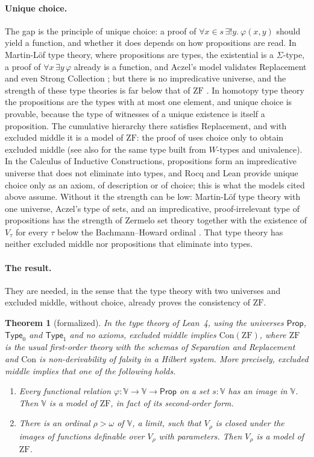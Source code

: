 \documentclass[10pt]{article}
\newtheorem{theorem}{Theorem}[section]
\theoremstyle{definition}
\theoremstyle{remark}
\newcommand{\Prop}{\mathsf{Prop}}
\newcommand{\Type}{\mathsf{Type}}
\newcommand{\ZF}{\mathrm{ZF}}
\newcommand{\Con}{\mathrm{Con}}
\newcommand{\V}{\mathbb{V}}
\begin{document}
\paragraph{Unique choice.}
The gap is the principle of unique choice: a proof of
$\forall x{\in}s\,\exists!y.\ \varphi(x,y)$ should yield a function, and
whether it does depends on how propositions are read. In Martin-L\"of
type theory, where propositions are types, the existential is a
$\Sigma$-type, a proof of $\forall x\,\exists y\,\varphi$ already is a function,
and Aczel's model validates Replacement and even Strong Collection
\cite{aczel78}; but there is no impredicative universe, and the
strength of these type theories is far below that of $\ZF$
\cite{griffor94}. In homotopy type theory the propositions are the types
with at most one element, and unique choice is provable, because the
type of witnesses of a unique existence is itself a proposition. The
cumulative hierarchy there satisfies Replacement, and with excluded
middle it is a model of $\ZF$: the proof of \cite[Theorem~10.5.11]{hottbook}
uses choice only to obtain excluded middle (see also \cite{gylterud18}
for the same type built from $W$-types and univalence). In the Calculus
of Inductive Constructions, propositions form an impredicative universe
that does not eliminate into types, and Rocq and Lean provide unique
choice only as an axiom, of description or of choice; this is what the
models cited above assume. Without it the strength can be low: Martin-L\"of
type theory with one universe, Aczel's type of sets, and an impredicative,
proof-irrelevant type of propositions has the strength of Zermelo set
theory together with the existence of $V_\tau$ for every $\tau$ below the
Bachmann--Howard ordinal \cite{rathjen12}. That type theory has neither
excluded middle nor propositions that eliminate into types.

\paragraph{The result.}
They are needed, in the sense that the type theory with two universes
and excluded middle, without choice, already proves the consistency of
$\ZF$.

\begin{theorem}[formalized]\label{thm:main}
In the type theory of Lean~4, using the universes $\Prop$, $\Type_0$ and
$\Type_1$ and no axioms, excluded middle implies $\Con(\ZF)$, where $\ZF$
is the usual first-order theory with the schemas of Separation and
Replacement and $\Con$ is non-derivability of falsity in a Hilbert
system. More precisely, excluded middle implies that one of the
following holds.
\begin{enumerate}
\item Every functional relation $\varphi:\V\to\V\to\Prop$ on a set $s:\V$ has
  an image in $\V$. Then $\V$ is a model of $\ZF$, in fact of its
  second-order form.
\item There is an ordinal $\rho>\omega$ of $\V$, a limit, such that $V_\rho$ is
  closed under the images of functions definable over $V_\rho$ with
  parameters. Then $V_\rho$ is a model of $\ZF$.
\end{enumerate}
\end{theorem}
\end{document}
